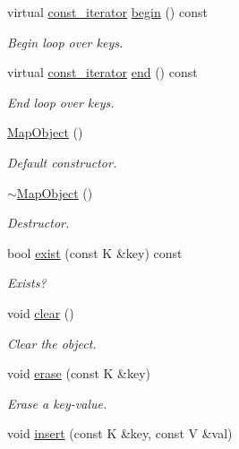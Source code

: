 \begin{DoxyCompactItemize}
virtual \mbox{\hyperlink{classADAT_1_1MapObject_a4622cd7d3b6fed18fe226d28091cc6c8}{const\+\_\+iterator}} \mbox{\hyperlink{classADAT_1_1MapObject_a7f4f6830f0efcc2fcd7bb2aebe0b0c95}{begin}} () const
\begin{DoxyCompactList}\small\item\em Begin loop over keys. \end{DoxyCompactList}\item 
virtual \mbox{\hyperlink{classADAT_1_1MapObject_a4622cd7d3b6fed18fe226d28091cc6c8}{const\+\_\+iterator}} \mbox{\hyperlink{classADAT_1_1MapObject_a1162459ba16798247ab64ee38be25bca}{end}} () const
\begin{DoxyCompactList}\small\item\em End loop over keys. \end{DoxyCompactList}\item 
\mbox{\hyperlink{classADAT_1_1MapObject_a27943eb119ceceef215cf8d638da096e}{Map\+Object}} ()
\begin{DoxyCompactList}\small\item\em Default constructor. \end{DoxyCompactList}\item 
\mbox{\hyperlink{classADAT_1_1MapObject_a11fc724ec76293a4ae1ae98aa5032dfd}{$\sim$\+Map\+Object}} ()
\begin{DoxyCompactList}\small\item\em Destructor. \end{DoxyCompactList}\item 
bool \mbox{\hyperlink{classADAT_1_1MapObject_a1d22f979e34bda97c3dc89d5fc937d3b}{exist}} (const K \&key) const
\begin{DoxyCompactList}\small\item\em Exists? \end{DoxyCompactList}\item 
void \mbox{\hyperlink{classADAT_1_1MapObject_ad4a8a70a7c12d4bdc488d6eac20388a1}{clear}} ()
\begin{DoxyCompactList}\small\item\em Clear the object. \end{DoxyCompactList}\item 
void \mbox{\hyperlink{classADAT_1_1MapObject_aa93bbf650a37c70e91904c9e7566eb6f}{erase}} (const K \&key)
\begin{DoxyCompactList}\small\item\em Erase a key-\/value. \end{DoxyCompactList}\item 
void \mbox{\hyperlink{classADAT_1_1MapObject_a5389738841dca1228aefe6935c464a78}{insert}} (const K \&key, const V \&val)

\end{DoxyCompactItemize}

